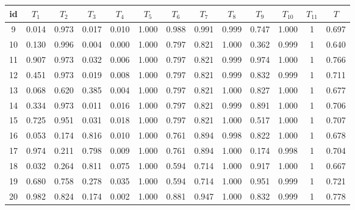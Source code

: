 \documentclass{classrep}
\begin{document}
\begin{center}
  \begin{table}[H]
  \begin{adjustbox}{center=11cm}
    \begin{tabularx}{\textwidth}{ccccccccccccc}
    id & $T_1$ & $T_2$ & $T_3$ & $T_4$ & $T_5$ & $T_6$ & $T_7$ & $T_8$ & $T_9$ & $T_{10}$ & $T_{11}$ & $T$ \\ \hline 
    9&	0.014	&	0.973	&	0.017	&	0.010	&	1.000	&	0.988	&	0.991	&	0.999	&	0.747	&	1.000	&	1	&	0.697	\\ \hline
10	&	0.130	&	0.996	&	0.004	&	0.000	&	1.000	&	0.797	&	0.821	&	1.000	&	0.362	&	0.999	&	1	&	0.640	\\ \hline
11	&	0.907	&	0.973	&	0.032	&	0.006	&	1.000	&	0.797	&	0.821	&	0.999	&	0.974	&	1.000	&	1	&	0.766	\\ \hline
12	&	0.451	&	0.973	&	0.019	&	0.008	&	1.000	&	0.797	&	0.821	&	0.999	&	0.832	&	0.999	&	1	&	0.711	\\ \hline
13	&	0.068	&	0.620	&	0.385	&	0.004	&	1.000	&	0.797	&	0.821	&	1.000	&	0.827	&	1.000	&	1	&	0.677	\\ \hline
14	&	0.334	&	0.973	&	0.011	&	0.016	&	1.000	&	0.797	&	0.821	&	0.999	&	0.891	&	1.000	&	1	&	0.706	\\ \hline
15	&	0.725	&	0.951	&	0.031	&	0.018	&	1.000	&	0.797	&	0.821	&	1.000	&	0.517	&	1.000	&	1	&	0.707	\\ \hline
16	&	0.053	&	0.174	&	0.816	&	0.010	&	1.000	&	0.761	&	0.894	&	0.998	&	0.822	&	1.000	&	1	&	0.678	\\ \hline
17	&	0.974	&	0.211	&	0.798	&	0.009	&	1.000	&	0.761	&	0.894	&	1.000	&	0.174	&	0.998	&	1	&	0.704	\\ \hline
18	&	0.032	&	0.264	&	0.811	&	0.075	&	1.000	&	0.594	&	0.714	&	1.000	&	0.917	&	1.000	&	1	&	0.667	\\ \hline
19	&	0.680	&	0.758	&	0.278	&	0.035	&	1.000	&	0.594	&	0.714	&	1.000	&	0.951	&	0.999	&	1	&	0.721	\\ \hline
20	&	0.982	&	0.824	&	0.174	&	0.002	&	1.000	&	0.881	&	0.947	&	1.000	&	0.832	&	0.999	&	1	&	0.778	\\ \hline

\end{tabularx}
\end{adjustbox}
\end{table}
\end{center}
\end{document}
